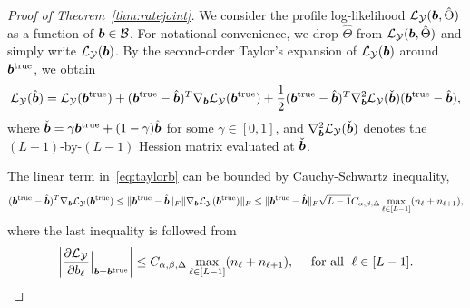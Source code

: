 \documentclass[11pt]{article}
\theoremstyle{plain}
\theoremstyle{definition}
\begin{document}
\begin{proof}[Proof of Theorem~\ref{thm:ratejoint}]
We consider the profile log-likelihood $\mathcal{L}_{\mathcal{Y}}(\bm{b}, \hat \Theta)$ as a function of $\bm{b}\in\mathcal{B}$. For notational convenience, we drop $\hat \Theta$ from $\mathcal{L}_{\mathcal{Y}}(\bm{b}, \hat \Theta)$ and simply write $\mathcal{L}_{\mathcal{Y}}(\bm{b})$. By the second-order Taylor's expansion of $\mathcal{L}_{\mathcal{Y}}(\bm{b})$ around $\bm{b}^{\mathrm{true}}$, we obtain
\begin{equation}\label{eq:taylorb}
\mathcal{L}_{\mathcal{Y}}(\hat{\bm{b}})=\mathcal{L}_{\mathcal{Y}}(\bm{b}^{\mathrm{true}})+(\bm{b}^{\mathrm{true}}-\hat{\bm{b}})^T\nabla_{\bm{b}}\mathcal{L}_{\mathcal{Y}}(\bm{b}^{\mathrm{true}})+ {1\over 2}(\bm{b}^{\mathrm{true}}-\hat{\bm{b}})^T\nabla^2_{\bm{b}}\mathcal{L}_{\mathcal{Y}}(\check{\bm{b}})(\bm{b}^{\mathrm{true}}-\hat{\bm{b}}),
\end{equation}
where $\check{\bm{b}}=\gamma\bm{b}^{\mathrm{true}}+(1-\gamma)\hat{\bm{b}}$ for some $\gamma\in[0,1]$, and $\nabla^2_{\bm{b}}\mathcal{L}_{\mathcal{Y}}(\check{\bm{b}})$ denotes the $(L-1)$-by-$(L-1)$ Hession matrix evaluated at $\check{\bm{b}}$.

The linear term in~\eqref{eq:taylorb} can be bounded by Cauchy-Schwartz inequality,
\begin{equation}\label{eq:linearb}
(\bm{b}^{\mathrm{true}}-\hat{\bm{b}})^T\nabla_{\bm{b}}\mathcal{L}_{\mathcal{Y}}(\bm{b}^{\mathrm{true}})\leq \lVert\bm{b}^{\mathrm{true}}-\hat{\bm{b}}\rVert_F\lVert\nabla_{\bm{b}}\mathcal{L}_{\mathcal{Y}}(\bm{b}^{\mathrm{true}})\rVert_F
\leq \lVert\bm{b}^{\mathrm{true}}-\hat{\bm{b}}\rVert_F\sqrt{L-1}C_{\alpha,\beta,\Delta}\max_{\ell\in[L-1]}(n_\ell+n_{\ell+1}),
\end{equation}
where the last inequality is followed from
\[
\left|{\partial \mathcal{L}_{\mathcal{Y}}\over \partial b_\ell}\Big|_{\bm{b}=\bm{b}^{\mathrm{true}}}\right| \leq C_{\alpha,\beta,\Delta}\max_{\ell\in[L-1]}(n_{\ell}+n_{\ell+1}), \quad \textrm{ for all } \; \ell\in [L-1].
\]


\end{proof}
\end{document}
